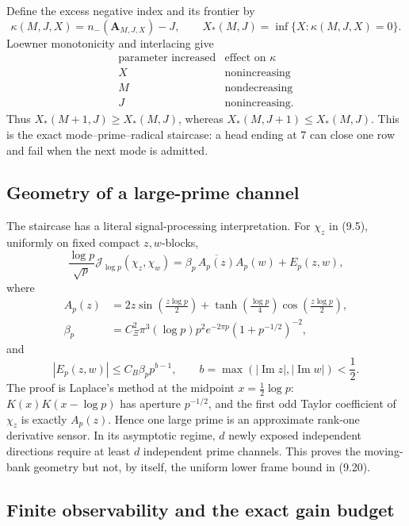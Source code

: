 \documentclass[11pt]{amsart}
\theoremstyle{definition}
\theoremstyle{remark}
\begin{document}
Define the excess negative index and its frontier by
\[
 \kappa(M,J,X)=n_-(\mathbf A_{M,J,X})-J,
\qquad
 X_*(M,J)=\inf\{X:\kappa(M,J,X)=0\}.
\tag{9.21}
\]
Loewner monotonicity and interlacing give
\cite{Loewner1934,Bhatia1997}
\[
\begin{array}{c|c}
\text{parameter increased}&\text{effect on }\kappa\\ \hline
X&\text{nonincreasing}\\
M&\text{nondecreasing}\\
J&\text{nonincreasing}.
\end{array}
\tag{9.22}
\]
Thus \(X_*(M+1,J)\ge X_*(M,J)\), whereas
\(X_*(M,J+1)\le X_*(M,J)\).  This is the exact mode--prime--radical
staircase: a head ending at \(7\) can close one row and fail when the next
mode is admitted.

\subsection{Geometry of a large-prime channel}

The staircase has a literal signal-processing interpretation.  For
\(\chi_z\) in (9.5), uniformly on fixed compact \(z,w\)-blocks,
\[
 \boxed{
 \frac{\log p}{\sqrt p}\mathcal J_{\log p}(\chi_z,\chi_w)
 =\beta_p\,\overline{A_p(z)}A_p(w)+E_p(z,w),}
\tag{9.23}
\]
where
\[
\begin{aligned}
 A_p(z)
 &=2z\sin\!\left(\frac{z\log p}{2}\right)
 +\tanh\!\left(\frac{\log p}{4}\right)
  \cos\!\left(\frac{z\log p}{2}\right),\\
 \beta_p
 &=C_\Xi^2\pi^3(\log p)p^2e^{-2\pi p}
   (1+p^{-1/2})^{-2},
\end{aligned}
\tag{9.24}
\]
and
\[
 |E_p(z,w)|\le C_B\beta_pp^{b-1},
 \qquad b=\max(|\operatorname{Im}z|,|\operatorname{Im}w|)<\frac12.
\tag{9.25}
\]
The proof is Laplace's method at the midpoint \(x=\frac12\log p\):
\(K(x)K(x-\log p)\) has aperture \(p^{-1/2}\), and the first odd Taylor
coefficient of \(\chi_z\) is exactly \(A_p(z)\).  Hence one large prime is
an approximate rank-one derivative sensor.  In its asymptotic regime,
\(d\) newly exposed independent directions require at least \(d\)
independent prime channels.  This proves the moving-bank geometry but not,
by itself, the uniform lower frame bound in (9.20).

\subsection{Finite observability and the exact gain budget}
\end{document}
